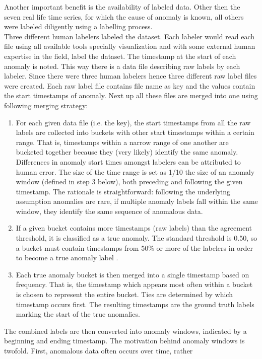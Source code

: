 \documentclass[12pt]{article}
\begin{document}
Another important benefit is the availability of labeled data. Other then the seven real life time series, for which the cause of anomaly is known, all others were labeled diligently using a labelling process. \\
\break
Three different human labelers labeled the dataset. Each labeler would read each file using all available tools specially visualization and with some external human expertise in the field, label the dataset. The timestamp at the start of each anomaly is noted. This way there is a data file describing raw labels by each labeler. Since there were three human labelers hence three different raw label files were created. Each raw label file contains file name as key and the values contain the start timestamps of anomaly. Next up all these files are merged into one using following merging strategy:
\begin{enumerate}
\item  For each given data file (i.e. the key), the start timestamps from all
the raw labels are collected into buckets with other start timestamps
within a certain range. That is, timestamps within a narrow range of
one another are bucketed together because they (very likely)
identify the same anomaly. Differences in anomaly start times
amongst labelers can be attributed to human error. The size of the
time range is set as 1/10 the size of an anomaly window (defined in
step 3 below), both preceding and following the given timestamp.
The rationale is straightforward: following the underlying
assumption anomalies are rare, if multiple anomaly labels fall within
the same window, they identify the same sequence of anomalous
data.
\item If a given bucket contains more timestamps (raw labels) than the
agreement threshold, it is classified as a true anomaly. The
standard threshold is 0.50, so a bucket must contain timestamps
from 50\% or more of the labelers in order to become a true
anomaly label .
\item Each true anomaly bucket is then merged into a single timestamp
based on frequency. That is, the timestamp which appears most
often within a bucket is chosen to represent the entire bucket. Ties
are determined by which timestamp occurs first. The resulting
timestamps are the ground truth labels marking the start of the true
anomalies.
\end{enumerate}
The combined labels are then converted into anomaly windows, indicated
by a beginning and ending timestamp. The motivation behind anomaly
windows is twofold. First, anomalous data often occurs over time, rather
\end{document}
